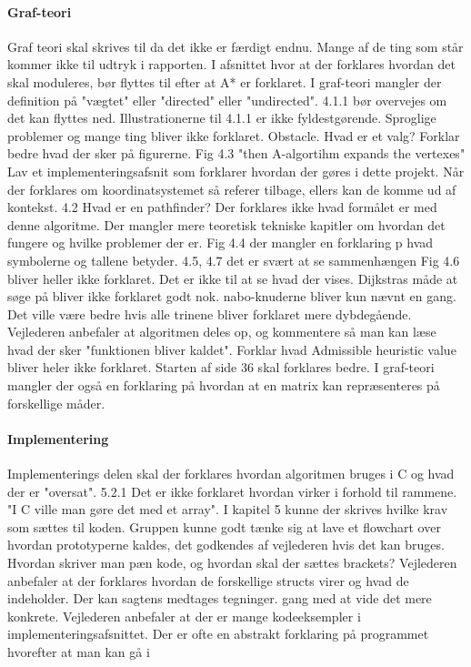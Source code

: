 \documentclass[article,11pt]{memoir}
\begin{document}
\paragraph{Graf-teori}
Graf teori skal skrives til da det ikke er færdigt endnu. Mange af de ting som står kommer ikke til udtryk i rapporten. I afsnittet hvor at der forklares hvordan det skal moduleres, bør flyttes til efter at A* er forklaret. I graf-teori mangler der definition på "vægtet" eller "directed" eller "undirected". 
4.1.1 bør overvejes om det kan flyttes ned.
Illustrationerne til 4.1.1 er ikke fyldestgørende. Sproglige problemer og mange ting bliver ikke forklaret. Obstacle. Hvad er et valg? Forklar bedre hvad der sker på figurerne. 
Fig 4.3 "then A-algortihm expands the vertexes"
Lav et implementeringsafsnit som forklarer hvordan der gøres i dette projekt. Når der forklares om koordinatsystemet så referer tilbage, ellers kan de komme ud af kontekst.
4.2 Hvad er en pathfinder? Der forklares ikke hvad formålet er med denne algoritme. Der mangler mere teoretisk tekniske kapitler om hvordan det fungere og hvilke problemer der er.
Fig 4.4 der mangler en forklaring p hvad symbolerne og tallene betyder.
4.5, 4.7 det er svært at se sammenhængen  
Fig 4.6 bliver heller ikke forklaret. Det er ikke til at se hvad der vises.
Dijkstras måde at søge på bliver ikke forklaret godt nok. nabo-knuderne bliver kun nævnt en gang. Det ville være bedre hvis alle trinene bliver forklaret mere dybdegående. Vejlederen anbefaler at algoritmen deles op, og kommentere så man kan læse hvad der sker "funktionen bliver kaldet". 
Forklar hvad Admissible heuristic value bliver heler ikke forklaret.
Starten af side 36 skal forklares bedre.
I graf-teori mangler der også en forklaring på hvordan at en matrix kan repræsenteres på forskellige måder. 

\paragraph{Implementering}
Implementerings delen skal der forklares hvordan algoritmen bruges i C og hvad der er "oversat".
5.2.1 Det er ikke forklaret hvordan virker i forhold til rammene. "I C ville man gøre det med et array".
I kapitel 5 kunne der skrives hvilke krav som sættes til koden. Gruppen kunne godt tænke sig at lave et flowchart over hvordan prototyperne kaldes, det godkendes af vejlederen hvis det kan bruges. Hvordan skriver man pæn kode, og hvordan skal der sættes brackets?
Vejlederen anbefaler at der forklares hvordan de forskellige structs virer og hvad de indeholder. Der kan sagtens medtages tegninger.
gang med at vide det mere konkrete.
Vejlederen anbefaler at der er mange kodeeksempler i implementeringsafsnittet. Der er ofte en abstrakt forklaring på programmet hvorefter at man kan gå i 
\end{document}
